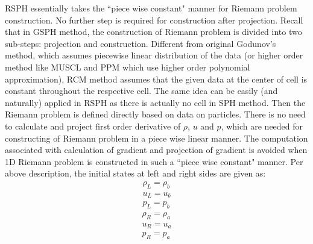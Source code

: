 RSPH essentially takes the ``piece wise constant" manner for Riemann problem construction. No further step is required for construction after projection. Recall that in GSPH method, the construction of Riemann problem is divided into two sub-steps: projection and construction. 
Different from original Godunov's method, which assumes piecewise linear distribution of the data (or higher order method like MUSCL and PPM which use higher order polynomial approximation), RCM method assumes that the given data at the center of cell is constant throughout the respective cell. The same idea can be easily (and naturally) applied in RSPH as there is actually no cell in SPH method. Then the Riemann problem is defined directly based on data on particles. There is no need to calculate and project first order derivative of $\rho$, $u$ and $p$, which are needed for constructing of Riemann problem in a piece wise linear manner. The computation associated with calculation of gradient and projection of gradient is avoided when 1D Riemann problem is constructed in such a ``piece wise constant" manner.
Per above description, the initial states at left and right sides are given as: 
\begin{eqnarray}
\rho_L = \rho_b 
\label{eq:Riemann-Prob-define-L-rho} \\
u_L = u_b 
\label{eq:Riemann-Prob-define-L-v} \\
p_L = p_b 
\label{eq:Riemann-Prob-define-L-p}
\end{eqnarray}
\begin{eqnarray}
\rho_R = \rho_a 
\label{eq:Riemann-Prob-define-R-rho} \\
u_R = u_a 
\label{eq:Riemann-Prob-define-R-v} \\
p_R = p_a 
\label{eq:Riemann-Prob-define-R-p}
\end{eqnarray}

